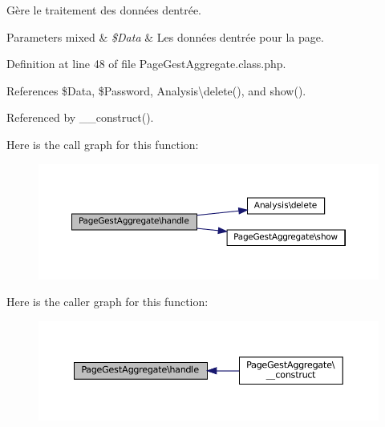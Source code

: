 Gère le traitement des données d\textquotesingle{}entrée.


\begin{DoxyParams}[1]{Parameters}
mixed & {\em \$\+Data} & Les données d\textquotesingle{}entrée pour la page. \\
\hline
\end{DoxyParams}


Definition at line 48 of file Page\+Gest\+Aggregate.\+class.\+php.



References \$\+Data, \$\+Password, Analysis\textbackslash{}delete(), and show().



Referenced by \+\_\+\+\_\+construct().

Here is the call graph for this function\+:\nopagebreak
\begin{figure}[H]
\begin{center}
\leavevmode
\includegraphics[width=350pt]{class_page_gest_aggregate_a9c4a2d111c979d9257b01312b73fd508_cgraph}
\end{center}
\end{figure}
Here is the caller graph for this function\+:\nopagebreak
\begin{figure}[H]
\begin{center}
\leavevmode
\includegraphics[width=350pt]{class_page_gest_aggregate_a9c4a2d111c979d9257b01312b73fd508_icgraph}
\end{center}
\end{figure}
\mbox{\label{class_page_gest_aggregate_ae270b8be8cd1651c4ef69d02ee4297e4}} 
